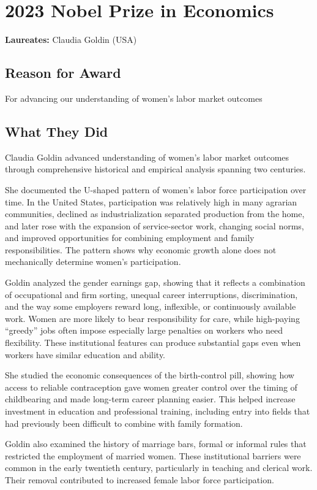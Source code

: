 \chapter{2023 Nobel Prize in Economics}
\textbf{Laureates: }Claudia Goldin (USA)

\section*{Reason for Award}
For advancing our understanding of women's labor market outcomes

\section{What They Did}
Claudia Goldin advanced understanding of women's labor market outcomes through
comprehensive historical and empirical analysis spanning two centuries.

She documented the U-shaped pattern of women's labor force participation over
time. In the United States, participation was relatively high in many agrarian
communities, declined as industrialization separated production from the home,
and later rose with the expansion of service-sector work, changing social norms,
and improved opportunities for combining employment and family responsibilities.
The pattern shows why economic growth alone does not mechanically determine
women's participation.

Goldin analyzed the gender earnings gap, showing that it reflects a combination
of occupational and firm sorting, unequal career interruptions, discrimination,
and the way some employers reward long, inflexible, or continuously available
work. Women are more likely to bear responsibility for care, while high-paying
``greedy'' jobs often impose especially large penalties on workers who need
flexibility. These institutional features can produce substantial gaps even
when workers have similar education and ability.

She studied the economic consequences of the birth-control pill, showing how
access to reliable contraception gave women greater control over the timing of
childbearing and made long-term career planning easier. This helped increase
investment in education and professional training, including entry into fields
that had previously been difficult to combine with family formation.

Goldin also examined the history of marriage bars, formal or informal rules that
restricted the employment of married women. These institutional barriers were
common in the early twentieth century, particularly in teaching and clerical
work. Their removal contributed to increased female labor force participation.

